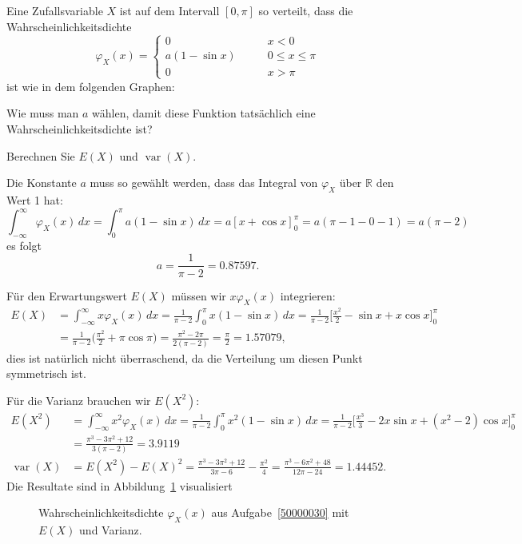 Eine Zufallsvariable $X$ ist auf dem Intervall $[0,\pi]$ so verteilt,
dass die Wahrscheinlichkeitsdichte
\[
\varphi_X(x)
=
\begin{cases}
0&\qquad x < 0\\
a(1-\sin x)&\qquad 0\le x \le \pi\\
0&\qquad x > \pi
\end{cases}
\]
ist wie in dem folgenden Graphen:
\begin{center}
\end{center}
\begin{teilaufgaben}
\item
Wie muss man $a$ wählen, damit diese Funktion tatsächlich 
eine Wahrscheinlichkeitsdichte ist?
\item
Berechnen Sie $E(X)$ und $\operatorname{var}(X)$.
\end{teilaufgaben}


\begin{loesung}
\begin{teilaufgaben}
\item Die Konstante $a$ muss so gewählt werden, dass das Integral von
$\varphi_X$ über $\mathbb R$ den Wert 1 hat:
\[
\int_{-\infty}^{\infty}\varphi_X(x)\,dx
=
\int_0^\pi a(1-\sin x)\,dx
=
a[x+\cos x]_0^\pi
=
a(\pi - 1 - 0 - 1) = a(\pi-2)
\]
es folgt
\[
a=\frac1{\pi -2}=0.87597.
\]
\item
Für den Erwartungswert $E(X)$ müssen wir $x\varphi_X(x)$ integrieren:
\begin{align*}
E(X)
&=
\int_{-\infty}^\infty x\varphi_X(x)\,dx
=
\frac1{\pi-2}\int_0^\pi x(1-\sin x)\,dx
=
\frac1{\pi - 2} \biggl[\frac{x^2}{2}-\sin x + x\cos x\biggr]_0^\pi
\\
&=
\frac1{\pi - 2}\biggl(\frac{\pi^2}{2} +\pi\cos\pi\biggr)
=
\frac{\pi^2-2\pi}{2(\pi-2)}=\frac{\pi}{2} = 1.57079,
\end{align*}
dies ist natürlich nicht überraschend, da die Verteilung um diesen
Punkt symmetrisch ist.

Für die Varianz brauchen wir $E(X^2)$:
\begin{align*}
E(X^2)
&=
\int_{-\infty}^\infty x^2\varphi_X(x)\,dx
=
\frac1{\pi-2}\int_0^\pi x^2(1-\sin x)\,dx
=
\frac1{\pi-2}\biggl[
\frac{x^3}{3}-2x\sin x+(x^2-2)\cos x
\biggr]_0^\pi
\\
&=
\frac{\pi^3-3\pi^2+12}{3(\pi-2)}
=
3.9119
\\
\operatorname{var}(X)
&=
E(X^2)-E(X)^2
=
\frac{\pi^3-3\pi^2+12}{3\pi - 6}
-
\frac{\pi^2}{4}
=
\frac {\pi^3-6\pi^2+48}{12\pi-24}
=
1.44452.
\end{align*}
Die Resultate sind in Abbildung~\ref{50000030:graphplus} visualisiert
\begin{figure}
\centering
{}
\caption{Wahrscheinlichkeitsdichte $\varphi_X(x)$ aus Aufgabe~\ref{50000030}
mit $E(X)$ und Varianz.
\label{50000030:graphplus}}
\end{figure}
\end{teilaufgaben}
\end{loesung}

